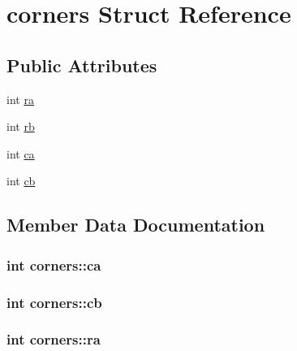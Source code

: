 \hypertarget{structcorners}{}\section{corners Struct Reference}
\label{structcorners}
\subsection*{Public Attributes}
\begin{DoxyCompactItemize}
\item 
int \hyperlink{structcorners_ad77606f823737fc1f1347b25e905c1a7}{ra}
\item 
int \hyperlink{structcorners_ad19782e14b4b905dd685ce98fe6e718a}{rb}
\item 
int \hyperlink{structcorners_a251b43b5ccbc55556b61ac665e9c6a6c}{ca}
\item 
int \hyperlink{structcorners_a9ce755b65013cb6bb59e4bd4c44878aa}{cb}
\end{DoxyCompactItemize}


\subsection{Member Data Documentation}
\subsubsection[{\texorpdfstring{ca}{ca}}]{\setlength{\rightskip}{0pt plus 5cm}int corners\+::ca}\hypertarget{structcorners_a251b43b5ccbc55556b61ac665e9c6a6c}{}\label{structcorners_a251b43b5ccbc55556b61ac665e9c6a6c}
\subsubsection[{\texorpdfstring{cb}{cb}}]{\setlength{\rightskip}{0pt plus 5cm}int corners\+::cb}\hypertarget{structcorners_a9ce755b65013cb6bb59e4bd4c44878aa}{}\label{structcorners_a9ce755b65013cb6bb59e4bd4c44878aa}
\subsubsection[{\texorpdfstring{ra}{ra}}]{\setlength{\rightskip}{0pt plus 5cm}int corners\+::ra}\hypertarget{structcorners_ad77606f823737fc1f1347b25e905c1a7}{}\label{structcorners_ad77606f823737fc1f1347b25e905c1a7}
